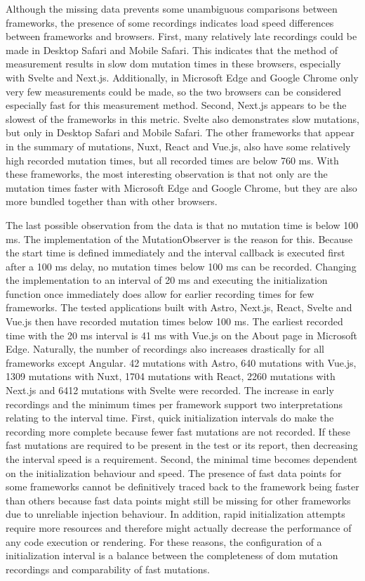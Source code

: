 \documentclass[a4paper, 12pt]{article}
\begin{document}
Although the missing data prevents some unambiguous comparisons between frameworks, the presence of some recordings indicates load speed differences between frameworks and browsers.
First, many relatively late recordings could be made in Desktop Safari and Mobile Safari.
This indicates that the method of measurement results in slow \acrshort{dom} mutation times in these browsers, especially with Svelte and Next.js.
Additionally, in Microsoft Edge and Google Chrome only very few measurements could be made, so the two browsers can be considered especially fast for this measurement method.
Second, Next.js appears to be the slowest of the frameworks in this metric.
Svelte also demonstrates slow mutations, but only in Desktop Safari and Mobile Safari.
The other frameworks that appear in the summary of mutations, Nuxt, React and Vue.js, also have some relatively high recorded mutation times, but all recorded times are below 760 ms.
With these frameworks, the most interesting observation is that not only are the mutation times faster with Microsoft Edge and Google Chrome, but they are also more bundled together than with other browsers.

The last possible observation from the data is that no mutation time is below 100 ms.
The implementation of the MutationObserver is the reason for this.
Because the start time is defined immediately and the interval callback is executed first after a 100 ms delay, no mutation times below 100 ms can be recorded.
Changing the implementation to an interval of 20 ms and executing the initialization function once immediately does allow for earlier recording times for few frameworks.
The tested applications built with Astro, Next.js, React, Svelte and Vue.js then have recorded mutation times below 100 ms.
The earliest recorded time with the 20 ms interval is 41 ms with Vue.js on the About page in Microsoft Edge.
Naturally, the number of recordings also increases drastically for all frameworks except Angular.
42 mutations with Astro, 640 mutations with Vue.js, 1309 mutations with Nuxt, 1704 mutations with React, 2260 mutations with Next.js and 6412 mutations with Svelte were recorded.
The increase in early recordings and the minimum times per framework support two interpretations relating to the interval time.
First, quick initialization intervals do make the recording more complete because fewer fast mutations are not recorded.
If these fast mutations are required to be present in the test or its report, then decreasing the interval speed is a requirement.
Second, the minimal time becomes dependent on the initialization behaviour and speed.
The presence of fast data points for some frameworks cannot be definitively traced back to the framework being faster than others because fast data points might still be missing for other frameworks due to unreliable injection behaviour.
In addition, rapid initialization attempts require more resources and therefore might actually decrease the performance of any code execution or rendering.
For these reasons, the configuration of a initialization interval is a balance between the completeness of \acrshort{dom} mutation recordings and comparability of fast mutations.
\end{document}
